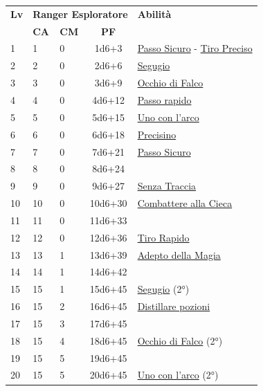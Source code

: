 {\begin{multicols}{2}

\noindent\begin{tabularx}{\linewidth}{p{0.3cm}|p{0.3cm}p{0.3cm}c|X|}
	\toprule
 \rowcolor{gray!20}	\textbf{Lv} & \multicolumn{3}{c|}{\textbf{Ranger Esploratore}} & \textbf{Abilità} \\
& \centering\arraybackslash \textbf{CA} & \centering\arraybackslash \textbf{CM} & \centering\arraybackslash \textbf{PF} & \\
	\toprule
	1 &1	& 0	&	1d6+3	&\hyperlink{Passo Sicuro}{Passo Sicuro} - \hyperlink{Tiro Preciso}{Tiro Preciso}\\
 \rowcolor{gray!20}2	&	2	& 0	&	2d6+6	&\hyperlink{Segugio}{Segugio}\\
	3	&	3	& 0	&	3d6+9	&\hyperlink{Occhio di Falco}{Occhio di Falco}\\
 \rowcolor{gray!20}4	&	4	& 0	&	4d6+12	&\hyperlink{Passo rapido}{Passo rapido}\\
	5	&	5	& 0	&	5d6+15	&\hyperlink{Uno con l'arco}{Uno con l'arco}\\
 \rowcolor{gray!20}6	&	6	& 0	&	6d6+18	&\hyperlink{Precisino}{Precisino}\\
	7	&	7	& 0	&	7d6+21	&\hyperlink{Passo Sicuro}{Passo Sicuro}\\
 \rowcolor{gray!20}8	&	8	& 0	&	8d6+24	&\\
	9	&	9	& 0	&	9d6+27	&\hyperlink{Senza Traccia}{Senza Traccia}\\
 \rowcolor{gray!20}10	&	10	& 0	&	10d6+30	&\hyperlink{Combattere alla Cieca}{Combattere alla Cieca}\\
	11	&	11	& 0	&	11d6+33	&\\
 \rowcolor{gray!20}12	&	12	& 0	&	12d6+36	&\hyperlink{Tiro Rapido}{Tiro Rapido}\\
	13	&	13	& 1	&	13d6+39	&\hyperlink{Adepto della Magia}{Adepto della Magia}\\
 \rowcolor{gray!20}14	&	14	& 1	&	14d6+42	&\\
	15	&	15	& 1	&	15d6+45	&\hyperlink{Segugio}{Segugio} (2°)\\
 \rowcolor{gray!20}16	&	15	& 2	&	16d6+45	&\hyperlink{Distillare pozioni}{Distillare pozioni}\\
	17	&	15	& 3	&	17d6+45	&\\
 \rowcolor{gray!20}18	&	15	& 4	&	18d6+45	&\hyperlink{Occhio di Falco}{Occhio di Falco} (2°)\\
	19	&	15	& 5	&	19d6+45	&\\
 \rowcolor{gray!20}20	&	15	& 5	&	20d6+45	&\hyperlink{Uno con l'arco}{Uno con l'arco} (2°)\\
\end{tabularx}


\end{multicols}}
